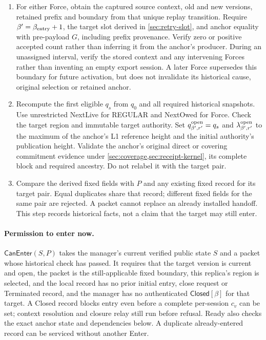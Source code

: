 \documentclass[11pt,a4paper]{article}
\newcommand{\tagg}[1]{\ensuremath{\mathsf{#1}}}
\begin{document}
\begin{enumerate}[label=(\roman*),itemsep=2pt]
is the first crossing at which the miss threshold is reached, and that
no matching higher-priority MSIG applies. Recompute the conditional
cooldown and its eligible alternative using the target authority and
owed snapshot. One missed window below $M$ is not a Force; an alarm or
local timeout is not proof.
\item For either Force, obtain the captured source context, old and
new versions, retained prefix and boundary from that unique replay
transition. Require $\beta'=\beta_{\rm entry}+1$, the target slot
derived in \cref{sec:retry-slot}, and anchor equality with pre-payload
$G$, including prefix provenance. Verify zero or positive accepted count
rather than inferring it from the anchor's producer.
During an unassigned interval, verify the stored context and any
intervening Forces rather than inventing an empty export session.
A later Force supersedes this boundary for future activation, but does
not invalidate its historical cause, original selection or retained anchor.
\item Recompute the first eligible $q_s$ from $q_0$ and all required
historical snapshots. Use unrestricted NextLive for REGULAR and
NextOwed for Force. Check the target region and immutable target authority.
Set $q^{\rm open}_{\beta',r'}=q_s$ and
$\lambda^{\rm open}_{\beta',r'}$ to the maximum of the anchor's L1
reference height and the initial authority's publication height.
Validate the anchor's original direct or covering commitment evidence
under \cref{sec:coverage,sec:receipt-kernel}, its complete block and
required ancestry.
Do not relabel it with the target pair.
\item Compare the derived fixed fields with $P$ and any existing
fixed record for its target pair. Equal duplicates share that record;
different fixed fields for the same pair are rejected. A packet cannot
replace an already installed handoff. This step records historical facts,
not a claim that the target may still enter.
\end{enumerate}

\paragraph{Permission to enter now.}
\label{sec:can-enter}
$\tagg{CanEnter}(S,P)$ takes the manager's current verified public state
$S$ and a packet whose historical check has passed. It requires that the
target version is current and open, the packet is the still-applicable
fixed boundary, this replica's region is selected, and the local record
has no prior initial entry, close request or Terminated record, and the
manager has no authenticated $\tagg{Closed}[\beta]$ for that target.
A Closed record blocks entry even before a complete per-session $c_v$
can be set; context resolution and closure relay still run before refusal. Ready
also checks the exact anchor state and dependencies below. A duplicate
already-entered record can be serviced without another Enter.
\end{document}
